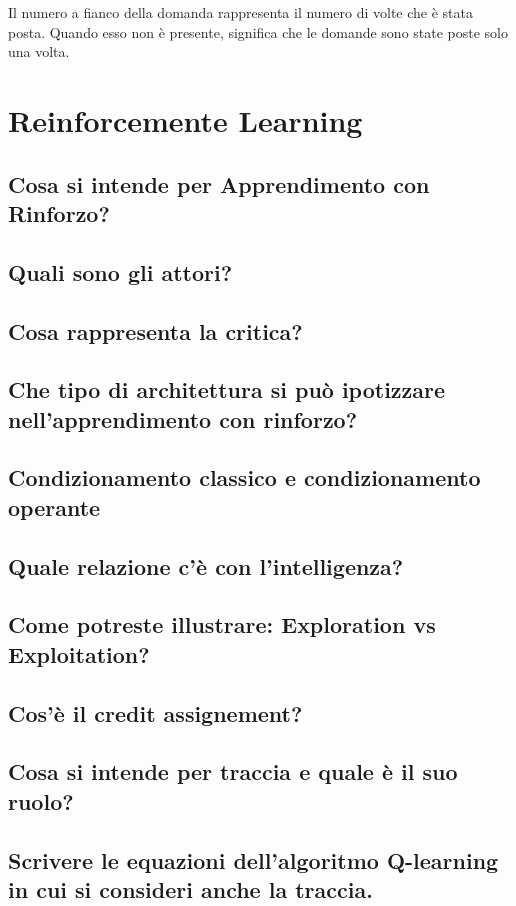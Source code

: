 \documentclass[\main/main.tex]{subfiles}
\begin{document}
Il numero a fianco della domanda rappresenta il numero di volte che è stata posta. Quando esso non è presente, significa che le domande sono state poste solo una volta.

\section{Reinforcemente Learning}

\subsection{Cosa si intende per Apprendimento con Rinforzo?}
\subsection{Quali sono gli attori?}
\subsection{Cosa rappresenta la critica?}
\subsection{Che tipo di architettura si può ipotizzare nell'apprendimento con rinforzo?}
\subsection{Condizionamento classico e condizionamento operante}
\subsection{Quale relazione c'è con l'intelligenza?}
\subsection{Come potreste illustrare: Exploration vs Exploitation?}
\subsection{Cos'è il credit assignement?}
\subsection{Cosa si intende per traccia e quale è il suo ruolo?}
\subsection{Scrivere le equazioni dell'algoritmo Q-learning in cui si consideri anche la traccia.}
\end{document}
